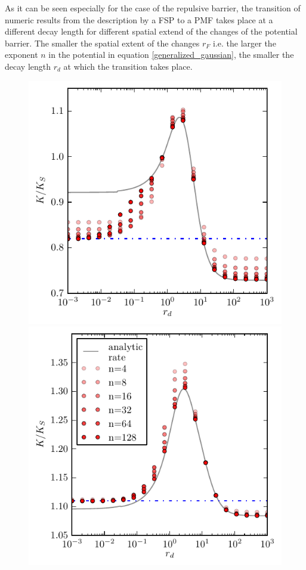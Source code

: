   As it can be seen especially for the case of the repulsive barrier, the transition of numeric results from the description by a FSP to a PMF takes place at a different decay length for different spatial extend of the changes of the potential barrier.  The smaller the spatial extent of the changes $r_F$ i.e. the larger the exponent $n$ in the potential in equation \eqref{generalized_gaussian}, the smaller the decay length $r_d$ at which the transition takes place. \\


\begin{minipage}[t]{.63 \textwidth}
     \begin{figure}[H]
        \hspace{-1cm } \includegraphics[width = 1 \textwidth]{plots/rb_cs.pdf} \\
        \hspace{-1cm } \includegraphics[width = 1 \textwidth]{plots/ab_cs.pdf} \\

\end{figure}
\end{minipage}
